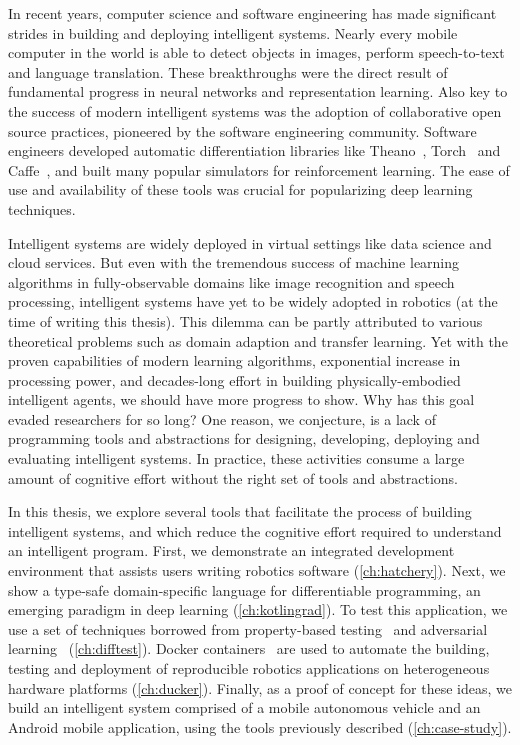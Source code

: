 \documentclass[12pt,initial,twoside,maitrise]{dms}
\numberwithin{equation}{section}
\numberwithin{table}{chapter}
\numberwithin{figure}{chapter}
\begin{document}
In recent years, computer science and software engineering has made significant strides in building and deploying intelligent systems. Nearly every mobile computer in the world is able to detect objects in images, perform speech-to-text and language translation. These breakthroughs were the direct result of fundamental progress in neural networks and representation learning. Also key to the success of modern intelligent systems was the adoption of collaborative open source practices, pioneered by the software engineering community. Software engineers developed automatic differentiation libraries like Theano~\citep{bergstra2010theano}, Torch~\citep{collobert2002torch} and Caffe~\citep{jia2014caffe}, and built many popular simulators for reinforcement learning. The ease of use and availability of these tools was crucial for popularizing deep learning techniques.

Intelligent systems are widely deployed in virtual settings like data science and cloud services. But even with the tremendous success of machine learning algorithms in fully-observable domains like image recognition and speech processing, intelligent systems have yet to be widely adopted in robotics (at the time of writing this thesis). This dilemma can be partly attributed to various theoretical problems such as domain adaption and transfer learning. Yet with the proven capabilities of modern learning algorithms, exponential increase in processing power, and decades-long effort in building physically-embodied intelligent agents, we should have more progress to show. Why has this goal evaded researchers for so long? One reason, we conjecture, is a lack of programming tools and abstractions for designing, developing, deploying and evaluating intelligent systems. In practice, these activities consume a large amount of cognitive effort without the right set of tools and abstractions.

In this thesis, we explore several tools that facilitate the process of building intelligent systems, and which reduce the cognitive effort required to understand an intelligent program. First, we demonstrate an integrated development environment that assists users writing robotics software (\autoref{ch:hatchery}). Next, we show a type-safe domain-specific language for differentiable programming, an emerging paradigm in deep learning (\autoref{ch:kotlingrad}). To test this application, we use a set of techniques borrowed from property-based testing~\citep{fink1997property} and adversarial learning~\citep{lowd2005adversarial} (\autoref{ch:difftest}). Docker containers~\citep{merkel2014docker} are used to automate the building, testing and deployment of reproducible robotics applications on heterogeneous hardware platforms (\autoref{ch:ducker}). Finally, as a proof of concept for these ideas, we build an intelligent system comprised of a mobile autonomous vehicle and an Android mobile application, using the tools previously described (\autoref{ch:case-study}).
\end{document}
